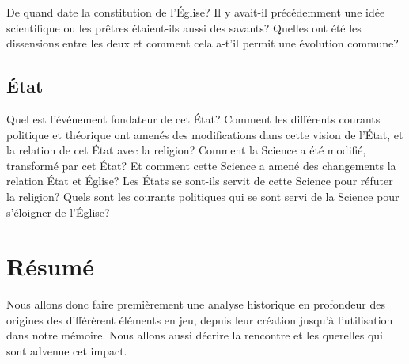 \documentclass{article}
\begin{document}
De quand date la constitution de l'Église? Il y avait-il précédemment une idée
scientifique ou les prêtres étaient-ils aussi des savants? Quelles ont été les
dissensions entre les deux et comment cela a-t'il permit une évolution commune?

\subsection{État}

Quel est l'événement fondateur de cet État? Comment les différents courants
politique et théorique ont amenés des modifications dans cette vision de l'État,
et la relation de cet État avec la religion? Comment la Science a été modifié,
transformé par cet État? Et comment cette Science a amené des changements la
relation État et Église? Les États se sont-ils servit de cette Science pour
réfuter la religion? Quels sont les courants politiques qui se sont servi de la
Science pour s'éloigner de l'Église?

\section{Résumé}

Nous allons donc faire premièrement une analyse historique en profondeur des
origines des différèrent éléments en jeu, depuis leur création jusqu'à
l'utilisation dans notre mémoire. Nous allons aussi décrire la rencontre et les
querelles qui sont advenue cet impact.
\end{document}
